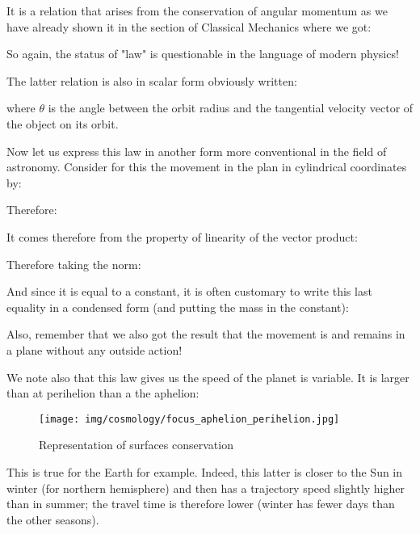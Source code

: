 	
	It is a relation that arises from the conservation of angular momentum as we have already shown it in the section of Classical Mechanics where we got:
	
	
	So again, the status of "law" is questionable in the language of modern physics!
	
	The latter relation is also in scalar form obviously written:
	
	where $\theta$ is the angle between the orbit radius and the tangential velocity vector of the object on its orbit.
	
	Now let us express this law in another form more conventional in the field of astronomy. Consider for this the movement in the plan in cylindrical coordinates by:
	
	Therefore:
	
	
	It comes therefore from the property of linearity of the vector product:
	
	Therefore taking the norm:
	
	And since it is equal to a constant, it is often customary to write this last equality in a condensed form (and putting the mass in the constant):
	
	Also, remember that we also got the result that the movement is and remains in a plane without any outside action!
	
	We note also that this law gives us the speed of the planet is variable. It is larger than at perihelion than a the aphelion:
	\begin{figure}[H]
		\centering
		\texttt{[image: img/cosmology/focus\_aphelion\_perihelion.jpg]}	
		\caption{Representation of surfaces conservation}
	\end{figure}
	This is true for the Earth for example. Indeed, this latter is closer to the Sun in winter (for northern hemisphere) and then has a trajectory speed slightly higher than in summer; the travel time is therefore lower (winter has fewer days than the other seasons).
	
